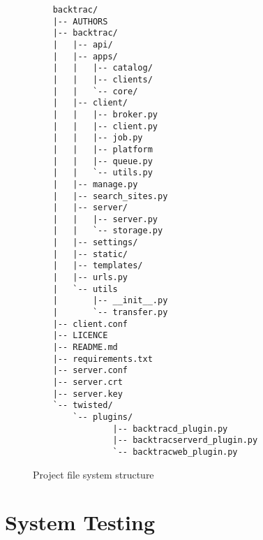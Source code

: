 \begin{figure}[H]
    \begin{center}
        \begin{verbatim}
    backtrac/
    |-- AUTHORS
    |-- backtrac/
    |   |-- api/
    |   |-- apps/
    |   |   |-- catalog/
    |   |   |-- clients/
    |   |   `-- core/
    |   |-- client/
    |   |   |-- broker.py
    |   |   |-- client.py
    |   |   |-- job.py
    |   |   |-- platform
    |   |   |-- queue.py
    |   |   `-- utils.py
    |   |-- manage.py
    |   |-- search_sites.py
    |   |-- server/
    |   |   |-- server.py
    |   |   `-- storage.py
    |   |-- settings/
    |   |-- static/
    |   |-- templates/
    |   |-- urls.py
    |   `-- utils
    |       |-- __init__.py
    |       `-- transfer.py
    |-- client.conf
    |-- LICENCE
    |-- README.md
    |-- requirements.txt
    |-- server.conf
    |-- server.crt
    |-- server.key
    `-- twisted/
        `-- plugins/
                |-- backtracd_plugin.py
                |-- backtracserverd_plugin.py
                `-- backtracweb_plugin.py
        \end{verbatim}
    \end{center}
    \caption{Project file system structure}
    \label{fig:detailed-file-structure}
\end{figure}

\section{System Testing}
\label{sec:appendix-system-testing}

